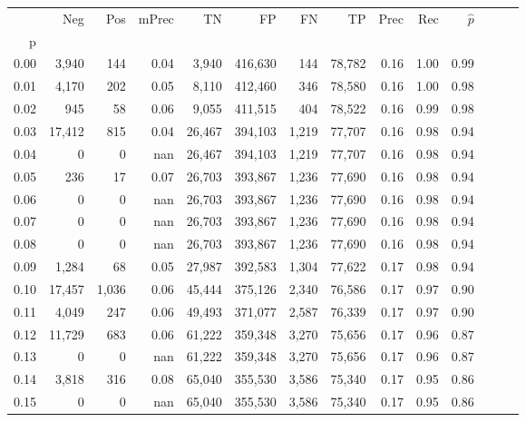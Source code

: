 \begin{tabular}{rrrrrrrrrrrrrr}
\toprule
{} &     Neg &    Pos & mPrec &       TN &       FP &      FN &      TP &  Prec &   Rec & $\hat{p}$ \\
p    &         &        &       &          &          &         &         &       &       &           \\
\midrule
0.00 &   3,940 &    144 &  0.04 &    3,940 &  416,630 &     144 &  78,782 &  0.16 &  1.00 &      0.99 \\
0.01 &   4,170 &    202 &  0.05 &    8,110 &  412,460 &     346 &  78,580 &  0.16 &  1.00 &      0.98 \\
0.02 &     945 &     58 &  0.06 &    9,055 &  411,515 &     404 &  78,522 &  0.16 &  0.99 &      0.98 \\
0.03 &  17,412 &    815 &  0.04 &   26,467 &  394,103 &   1,219 &  77,707 &  0.16 &  0.98 &      0.94 \\
0.04 &       0 &      0 &   nan &   26,467 &  394,103 &   1,219 &  77,707 &  0.16 &  0.98 &      0.94 \\
0.05 &     236 &     17 &  0.07 &   26,703 &  393,867 &   1,236 &  77,690 &  0.16 &  0.98 &      0.94 \\
0.06 &       0 &      0 &   nan &   26,703 &  393,867 &   1,236 &  77,690 &  0.16 &  0.98 &      0.94 \\
0.07 &       0 &      0 &   nan &   26,703 &  393,867 &   1,236 &  77,690 &  0.16 &  0.98 &      0.94 \\
0.08 &       0 &      0 &   nan &   26,703 &  393,867 &   1,236 &  77,690 &  0.16 &  0.98 &      0.94 \\
0.09 &   1,284 &     68 &  0.05 &   27,987 &  392,583 &   1,304 &  77,622 &  0.17 &  0.98 &      0.94 \\
0.10 &  17,457 &  1,036 &  0.06 &   45,444 &  375,126 &   2,340 &  76,586 &  0.17 &  0.97 &      0.90 \\
0.11 &   4,049 &    247 &  0.06 &   49,493 &  371,077 &   2,587 &  76,339 &  0.17 &  0.97 &      0.90 \\
0.12 &  11,729 &    683 &  0.06 &   61,222 &  359,348 &   3,270 &  75,656 &  0.17 &  0.96 &      0.87 \\
0.13 &       0 &      0 &   nan &   61,222 &  359,348 &   3,270 &  75,656 &  0.17 &  0.96 &      0.87 \\
0.14 &   3,818 &    316 &  0.08 &   65,040 &  355,530 &   3,586 &  75,340 &  0.17 &  0.95 &      0.86 \\
0.15 &       0 &      0 &   nan &   65,040 &  355,530 &   3,586 &  75,340 &  0.17 &  0.95 &      0.86 \\

\end{tabular}
